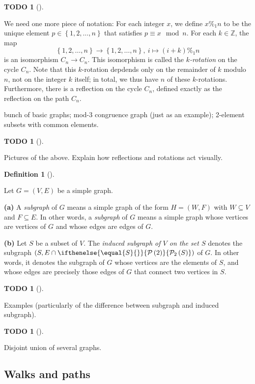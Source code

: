 \documentclass[numbers=enddot,12pt,final,onecolumn,notitlepage]{scrartcl}%
\theoremstyle{definition}
\newtheorem{defi}[theo]{Definition}
\newenvironment{definition}[1][]
{\begin{defi}[#1]\begin{leftbar}}
{\end{leftbar}\end{defi}}
\newtheorem{quest}[theo]{TODO}
\newenvironment{todo}[1][]
{\begin{quest}[#1]\begin{leftbar}}
{\end{leftbar}\end{quest}}
\newcommand{\ZZ}{\mathbb{Z}}
\newcommand{\powset}[2][]{\ifthenelse{\equal{#2}{}}{\mathcal{P}\left(#1\right)}{\mathcal{P}_{#1}\left(#2\right)}}
\newcommand{\set}[1]{\left\{ #1 \right\}}
\newcommand{\tup}[1]{\left( #1 \right)}
\begin{document}
\begin{todo}
\begin{itemize}
We need one more piece of notation: For each integer $x$, we define
$x \%_1 n$ to be the unique element $p \in \set{1,2,\ldots,n}$
that satisfies $p \equiv x \mod n$.
For each $k \in \ZZ$, the map
\[
\set{1,2,\ldots,n} \to \set{1,2,\ldots,n},
\ i \mapsto \tup{i+k} \%_1 n
\]
is an isomorphism $C_n \to C_n$. This isomorphism is called the
\textit{$k$-rotation} on the cycle $C_n$. Note that this $k$-rotation
depdends only on the remainder of $k$ modulo $n$, not on the integer
$k$ itself; in total, we thus have $n$ of these $k$-rotations.
Furthermore, there is a reflection on the cycle $C_n$, defined exactly
as the reflection on the path $C_n$.
\end{itemize}
bunch of basic graphs; mod-3 congruence graph (just as an example);
2-element subsets with common elements.
\end{todo}

\begin{todo}
Pictures of the above. Explain how reflections and rotations act
visually.
\end{todo}

\begin{definition} \label{def.intro.subgraph}
Let $G = \tup{V, E}$ be a simple graph.

\textbf{(a)} A \textit{subgraph} of $G$ means a simple graph of the
form $H = \tup{W, F}$ with $W \subseteq V$ and $F \subseteq E$. In
other words, a \textit{subgraph} of $G$ means a simple graph whose
vertices are vertices of $G$ and whose edges are edges of $G$.

\textbf{(b)} Let $S$ be a subset of $V$. The \textit{induced subgraph
of $V$ on the set $S$} denotes the subgraph
$\tup{S, E \cap \powset[2]{S}}$ of $G$. In other words, it denotes
the subgraph of $G$ whose vertices are the elements of $S$, and whose
edges are precisely those edges of $G$ that connect two vertices in
$S$.
\end{definition}

\begin{todo}
Examples (particularly of the difference between subgraph and
induced subgraph).
\end{todo}

\begin{todo}
Disjoint union of several graphs.
\end{todo}

\subsection{\label{sect.intro.walks}Walks and paths}
\end{document}
